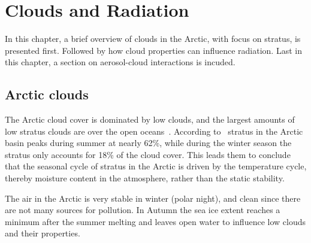 \chapter{Clouds and Radiation}%
\label{chap:theory}
In this chapter, a brief overview of clouds in the Arctic, with focus on stratus, is presented first. Followed by how cloud properties can influence radiation. Last in this chapter, a section on aerosol-cloud interactions is incuded.



\section{Arctic clouds}%
The Arctic cloud cover is dominated by low clouds, and the largest amounts of low stratus clouds are over the open oceans~\citep{Klein1993}. %
 According to~\citet{Klein1993} stratus in the Arctic basin peaks during summer at nearly 62\%, while during the winter season the stratus only accounts for 18\% of the cloud cover. This leads them to conclude that the seasonal cycle of stratus in the Arctic is driven by the temperature cycle, thereby moisture content in the atmosphere, rather than the static stability.%

The air in the Arctic is very stable in winter (polar night), and clean since there are not many sources for pollution. In Autumn the sea ice extent reaches a minimum after the summer melting and leaves open water to influence low clouds and their properties. 

